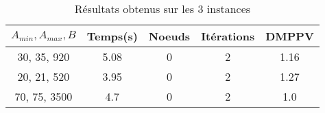 \documentclass[main.tex]{subfiles}
\begin{document}
\thispagestyle{empty}

\begin{table}
    \centering
    \caption{Résultats obtenus sur les 3 instances}
    \begin{tabular}{
    ccccc}
\hline	
	\textbf{$A_{min}, A_{max}, B$} &\textbf{Temps(s)} &\textbf{Noeuds} &\textbf{Itérations} &\textbf{DMPPV}\\
	\hline

	

	
30, 35, 920 &5.08 &0 &2 &1.16\\
20, 21, 520 &3.95 &0 &2 &1.27\\
70, 75, 3500 &4.7 &0 &2 &1.0\\
    \end{tabular}
\end{table}
\end{document}
